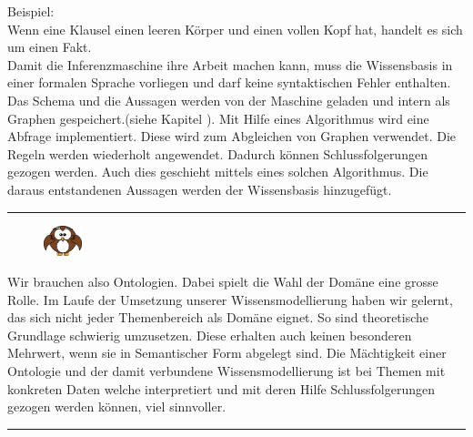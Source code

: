 Beispiel:\\
\noindent\hspace*{15mm} Wenn eine Klausel einen leeren Körper und einen vollen Kopf hat, handelt es sich um einen Fakt.\\

Damit die Inferenzmaschine ihre Arbeit machen kann, muss die Wissensbasis in einer formalen Sprache vorliegen und darf keine syntaktischen Fehler enthalten. Das Schema und die Aussagen werden von der Maschine geladen und intern als Graphen gespeichert.(siehe Kapitel ). Mit Hilfe eines Algorithmus wird eine Abfrage implementiert. Diese wird zum Abgleichen von Graphen verwendet. Die Regeln werden wiederholt angewendet. Dadurch können Schlussfolgerungen gezogen werden. Auch dies geschieht mittels eines solchen Algorithmus. Die daraus entstandenen Aussagen werden der Wissensbasis hinzugefügt.

\noindent\rule[1ex]{\textwidth}{1pt}
\vspace{0.1pt}
\begin{figure}
    \vspace{-19pt}
    \includegraphics[width=0.1\textwidth]{bilder/owl.png}
\end{figure}
Wir brauchen also Ontologien. Dabei spielt die Wahl der Domäne eine grosse Rolle. Im Laufe der Umsetzung unserer Wissensmodellierung haben wir gelernt, das sich nicht jeder Themenbereich als Domäne eignet. So sind theoretische Grundlage schwierig umzusetzen. Diese erhalten auch keinen besonderen Mehrwert, wenn sie in Semantischer Form abgelegt sind. Die Mächtigkeit einer Ontologie und der damit verbundene Wissensmodellierung ist bei Themen mit konkreten Daten welche interpretiert und mit deren Hilfe Schlussfolgerungen gezogen werden können, viel sinnvoller.\\

\noindent\rule[1ex]{\textwidth}{1pt}


